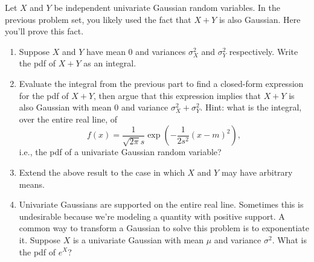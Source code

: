 \documentclass[submit]{harvardml}
\theoremstyle{plain}
\begin{document}
\begin{problem}
Let $X$ and $Y$ be independent univariate Gaussian random variables. In the previous problem set, you likely used the fact that $X + Y$ is also Gaussian. Here you'll prove this fact.

\begin{enumerate}[label=(\alph*)]
\item Suppose $X$ and $Y$ have mean 0 and variances $\sigma_X^2$ and $\sigma_Y^2$ respectively. Write the pdf of $X + Y$ as an integral.
\item Evaluate the integral from the previous part to find a closed-form expression for the pdf of $X+Y$, then argue that this expression implies that $X+Y$ is also Gaussian with mean $0$ and variance $\sigma_X^2 + \sigma_Y^2$. Hint: what is the integral, over the entire real line, of
\[
f(x) = \frac{1}{\sqrt{2\pi}s} \exp\left( -\frac{1}{2s^2}(x - m)^2 \right) ,
\] i.e., the pdf of a univariate Gaussian random variable?
\item Extend the above result to the case in which $X$ and $Y$ may have arbitrary means.
\item Univariate Gaussians are supported on the entire real line. Sometimes this is undesirable because we're modeling a quantity with positive support. A common way to transform a Gaussian to solve this problem is to exponentiate it. Suppose $X$ is a univariate Gaussian with mean $\mu$ and variance $\sigma^2$. What is the pdf of $e^X$?
\end{enumerate}
\end{problem}
\end{document}
